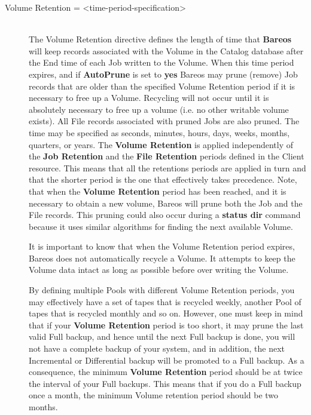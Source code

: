 \begin{description}
\label{VolRetention}
\item [Volume Retention = {\textless}time-period-specification{\textgreater}] \hfill \\
The Volume Retention directive defines the length of time that {\bf
Bareos} will keep records associated with the Volume in
the Catalog database after the End time of each Job written to the
Volume.  When this time period expires, and if {\bf AutoPrune} is set to
{\bf yes} Bareos may prune (remove) Job records that are older than the
specified Volume Retention period if it is necessary to free up a
Volume.  Recycling will not occur until it is absolutely necessary to
free up a volume (i.e. no other writable volume exists).
All File records associated with pruned Jobs are also
pruned.  The time may be specified as seconds, minutes, hours, days,
weeks, months, quarters, or years.  The {\bf Volume Retention} is
applied independently of the {\bf Job Retention} and the {\bf File
Retention} periods defined in the Client resource.  This means that all
the retentions periods are applied in turn and that the shorter period
is the one that effectively takes precedence.  Note, that when the {\bf
Volume Retention} period has been reached, and it is necessary to obtain
a new volume, Bareos will prune both the Job and the File records.  This
pruning could also occur during a {\bf status dir} command because it
uses similar algorithms for finding the next available Volume.

It is important to know that when the Volume Retention period expires,
Bareos does not automatically recycle a Volume. It attempts to keep the
Volume data intact as long as possible before over writing the Volume.

By defining multiple Pools with different Volume Retention periods, you
may effectively have a set of tapes that is recycled weekly, another
Pool of tapes that is recycled monthly and so on.  However, one must
keep in mind that if your {\bf Volume Retention} period is too short, it
may prune the last valid Full backup, and hence until the next Full
backup is done, you will not have a complete backup of your system, and
in addition, the next Incremental or Differential backup will be
promoted to a Full backup.  As a consequence, the minimum {\bf Volume
Retention} period should be at twice the interval of your Full backups.
This means that if you do a Full backup once a month, the minimum Volume
retention period should be two months.


\end{description}
